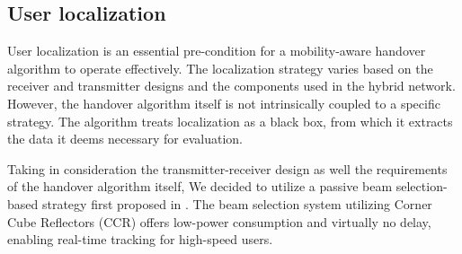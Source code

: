 \subsection{User localization}
\label{sec:mod-usr-loc}
User localization is an essential pre-condition for a mobility-aware handover algorithm to operate effectively. The localization strategy varies based on the receiver and transmitter designs and the components used in the hybrid network. However, the handover algorithm itself is not intrinsically coupled to a specific strategy. The algorithm treats localization as a black box, from which it extracts the data it deems necessary for evaluation. 

Taking in consideration the transmitter-receiver design as well the requirements of the handover algorithm itself, We decided to utilize a passive beam selection-based strategy first proposed in \cite{zeng_vcsel_2022}. The beam selection system utilizing Corner Cube Reflectors (CCR) offers low-power consumption and virtually no delay, enabling real-time tracking for high-speed users.
